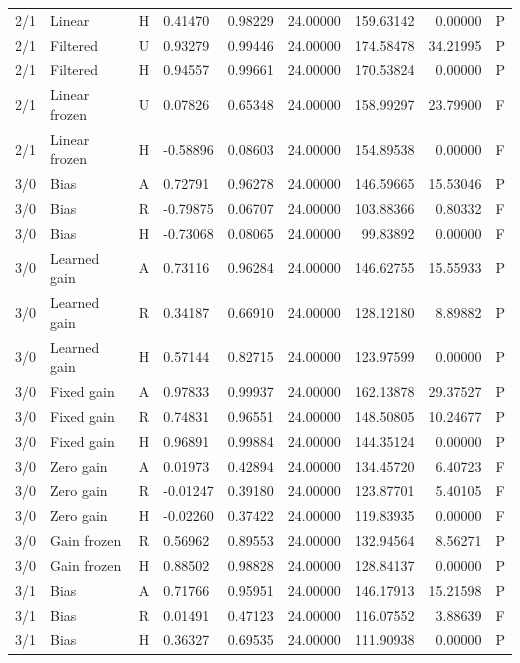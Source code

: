 \begin{longtable}{rlllrrrrl}
2/1 & Linear & H & 0.41470 & 0.98229 & 24.00000 & 159.63142 & 0.00000 & P \\
2/1 & Filtered & U & 0.93279 & 0.99446 & 24.00000 & 174.58478 & 34.21995 & P \\
2/1 & Filtered & H & 0.94557 & 0.99661 & 24.00000 & 170.53824 & 0.00000 & P \\
2/1 & Linear frozen & U & 0.07826 & 0.65348 & 24.00000 & 158.99297 & 23.79900 & F \\
2/1 & Linear frozen & H & -0.58896 & 0.08603 & 24.00000 & 154.89538 & 0.00000 & F \\
3/0 & Bias & A & 0.72791 & 0.96278 & 24.00000 & 146.59665 & 15.53046 & P \\
3/0 & Bias & R & -0.79875 & 0.06707 & 24.00000 & 103.88366 & 0.80332 & F \\
3/0 & Bias & H & -0.73068 & 0.08065 & 24.00000 & 99.83892 & 0.00000 & F \\
3/0 & Learned gain & A & 0.73116 & 0.96284 & 24.00000 & 146.62755 & 15.55933 & P \\
3/0 & Learned gain & R & 0.34187 & 0.66910 & 24.00000 & 128.12180 & 8.89882 & P \\
3/0 & Learned gain & H & 0.57144 & 0.82715 & 24.00000 & 123.97599 & 0.00000 & P \\
3/0 & Fixed gain & A & 0.97833 & 0.99937 & 24.00000 & 162.13878 & 29.37527 & P \\
3/0 & Fixed gain & R & 0.74831 & 0.96551 & 24.00000 & 148.50805 & 10.24677 & P \\
3/0 & Fixed gain & H & 0.96891 & 0.99884 & 24.00000 & 144.35124 & 0.00000 & P \\
3/0 & Zero gain & A & 0.01973 & 0.42894 & 24.00000 & 134.45720 & 6.40723 & F \\
3/0 & Zero gain & R & -0.01247 & 0.39180 & 24.00000 & 123.87701 & 5.40105 & F \\
3/0 & Zero gain & H & -0.02260 & 0.37422 & 24.00000 & 119.83935 & 0.00000 & F \\
3/0 & Gain frozen & R & 0.56962 & 0.89553 & 24.00000 & 132.94564 & 8.56271 & P \\
3/0 & Gain frozen & H & 0.88502 & 0.98828 & 24.00000 & 128.84137 & 0.00000 & P \\
3/1 & Bias & A & 0.71766 & 0.95951 & 24.00000 & 146.17913 & 15.21598 & P \\
3/1 & Bias & R & 0.01491 & 0.47123 & 24.00000 & 116.07552 & 3.88639 & F \\
3/1 & Bias & H & 0.36327 & 0.69535 & 24.00000 & 111.90938 & 0.00000 & P \\

\end{longtable}

